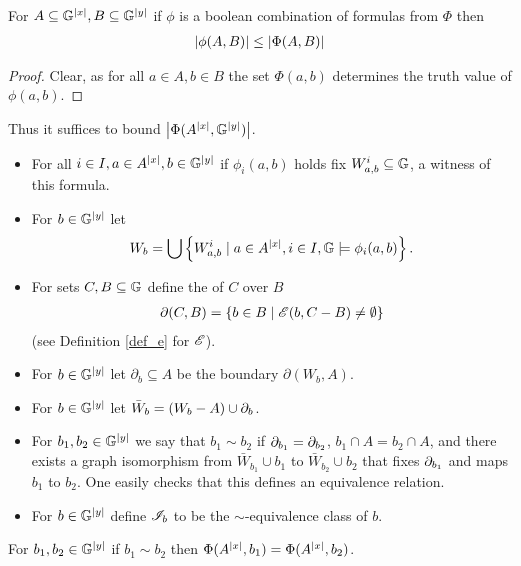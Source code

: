 \documentclass{amsart}
\begin{document}
\begin{Lemma}
  For $A \subseteq \mathbb G^{|x|}, B \subseteq \mathbb G^{|y|}$
  if $\phi$ is a boolean combination of formulas from $\Phi$ then
  \begin{align*}
    \left|\phi(A, B)\right| \leq \left|\Phi(A, B)\right|
  \end{align*}  
\end{Lemma}
\begin{proof}
  Clear, as for all $a \in A, b \in B$ the set $\Phi(a,b)$ determines the truth value of $\phi(a,b)$.
\end{proof}

Thus it suffices to bound  $\left|\Phi(A^{|x|}, \mathbb G^{|y|})\right|$.

\begin{Definition} \;
  \begin{itemize}
  \item For all $i \in I, a \in A^{|x|}, b \in \mathbb G^{|y|}$ if $\phi_i(a, b)$ holds fix $W^i_{a,b} \subseteq \mathbb G$, a witness of this formula.
  \item For $b \in \mathbb G^{|y|}$ let 
    \begin{align*}
      W_b = \bigcup \left\{W^i_{a,b} \mid a \in A^{|x|}, i \in I, \mathbb G \models \phi_i(a,b)\right\}.
    \end{align*}
  \item For sets $C, B \subseteq \mathbb G$ define the  of $C$ over $B$
    \begin{align*}
      \partial(C, B) = \left\{b \in B \mid \mathscr E(b, C - B) \neq \emptyset\right\}
    \end{align*}
    (see Definition \ref{def_e} for $\mathscr E$).
  \item For $b \in \mathbb G^{|y|}$ let $\partial_b \subseteq A$ be the boundary $\partial(W_b, A)$.
  \item For $b \in \mathbb G^{|y|}$ let $\bar W_b = (W_b - A) \cup \partial_b$.
  \item For $b_1, b_2 \in \mathbb G^{|y|}$ we say that $b_1 \sim b_2$ if $\partial_{b_1} = \partial_{b_2}$,
    $b_1 \cap A = b_2 \cap A$,
    and there exists a graph isomorphism from $\bar W_{b_1} \cup b_1$ to $\bar W_{b_2} \cup b_2$ that fixes $\partial_{b_1}$ and
    maps $b_1$ to $b_2$.
    One easily checks that this defines an equivalence relation.
  \item For $b \in \mathbb G^{|y|}$ define $\mathscr I_b$ to be the $\sim$-equivalence class of $b$.
  \end{itemize}
\end{Definition}

\begin{Lemma} \label {bound_trace}
  For $b_1, b_2 \in \mathbb G^{|y|}$ if $b_1 \sim b_2$ then $\Phi(A^{|x|}, b_1) = \Phi(A^{|x|}, b_2)$.
\end{Lemma}
\end{document}
